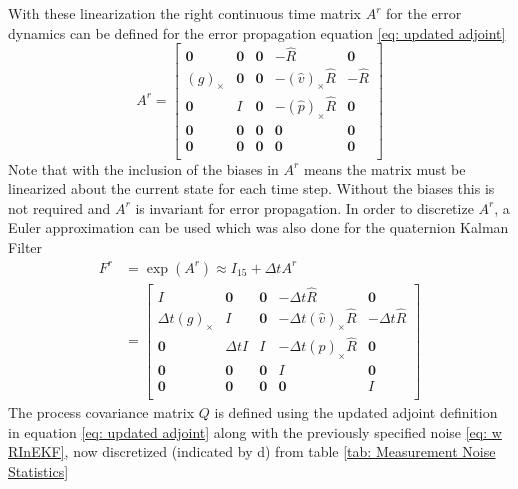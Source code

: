 With these linearization the right continuous time matrix $A^r$ for the error dynamics can be defined for the error propagation equation \eqref{eq: updated adjoint}
\begin{equation}
    A^r = \begin{bmatrix}
        \mathbf{0} & \mathbf{0} & \mathbf{0} & -\hat{R} & \mathbf{0} \\
        (g)_{\times} & \mathbf{0} & \mathbf{0} & -(\hat{v})_{\times} \hat{R} & -\hat{R} \\
        \mathbf{0} & I & \mathbf{0} & -(\hat{p})_{\times} \hat{R} & \mathbf{0} \\
        \mathbf{0} & \mathbf{0} & \mathbf{0} & \mathbf{0} & \mathbf{0} \\
        \mathbf{0} & \mathbf{0} & \mathbf{0} & \mathbf{0} & \mathbf{0} \\
    \end{bmatrix}
    \label{eq: A^r RInEKF}
\end{equation}
Note that with the inclusion of the biases in $A^r$ means the matrix must be linearized about the current state for each time step. Without the biases this is not required and $A^r$ is invariant for error propagation. In order to discretize $A^r$, a Euler approximation can be used which was also done for the quaternion Kalman Filter
\begin{equation}
    \begin{split}
        F^r &= \exp(A^r) \approx I_{15} + \Delta t A^r \\
            &= \begin{bmatrix}
            I & \mathbf{0} & \mathbf{0} & -\Delta t \hat{R} & \mathbf{0} \\
            \Delta t (g)_{\times} & I & \mathbf{0} & - \Delta t (\hat{v})_{\times} \hat{R} & -\Delta t \hat{R} \\
            \mathbf{0} & \Delta t I & I & -\Delta t (\hat{p})_{\times} \hat{R} & \mathbf{0} \\
            \mathbf{0} & \mathbf{0} & \mathbf{0} & I & \mathbf{0} \\
            \mathbf{0} & \mathbf{0} & \mathbf{0} & \mathbf{0} & I \\
        \end{bmatrix}
        \label{eq: F^r RInEKF}
    \end{split}
\end{equation}
The process covariance matrix $Q$ is defined using the updated adjoint definition in equation \eqref{eq: updated adjoint} along with the previously specified noise \eqref{eq: w RInEKF}, now discretized (indicated by d) from table \eqref{tab: Measurement Noise Statistics}
